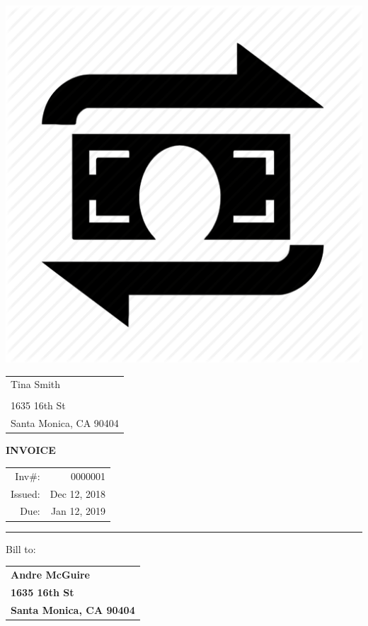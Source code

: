 \documentclass[10pt]{article}
\begin{document}
\begin{minipage}{.2\textwidth}
    \includegraphics[width=\linewidth]{logo.png}
\end{minipage}
\begin{minipage}{.3\textwidth}
    \begin{tabular}{l}
        Tina Smith \\ \\ 1635 16th St \\ Santa Monica, CA 90404
    \end{tabular}
\end{minipage} \hfill
\begin{minipage}{.3\textwidth}
    \hfill{\bf\Huge INVOICE}

    \vspace{12pt}

    \hfill\begin{tabular}{rr}
        Inv\#: & 0000001\\
        Issued: & Dec 12, 2018\\
        Due: & Jan 12, 2019
    \end{tabular}
\end{minipage}
{\color{gray} \hrule}

\def\arraystretch{1.5} %

Bill to:\\
\begin{tabular}{l}
\textbf{Andre McGuire} \\
\textbf{1635 16th St }\\
\textbf{Santa Monica, CA 90404}
\end{tabular}
\end{document}
